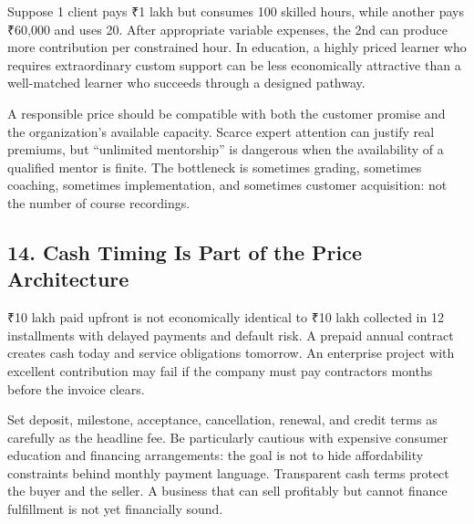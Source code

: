 Suppose 1 client pays ₹1 lakh but consumes 100 skilled hours, while another pays ₹60,000 and uses 20. After appropriate variable expenses, the 2nd can produce more contribution per constrained hour. In education, a highly priced learner who requires extraordinary custom support can be less economically attractive than a well-matched learner who succeeds through a designed pathway.

A responsible price should be compatible with both the customer promise and the organization's available capacity. Scarce expert attention can justify real premiums, but ``unlimited mentorship'' is dangerous when the availability of a qualified mentor is finite. The bottleneck is sometimes grading, sometimes coaching, sometimes implementation, and sometimes customer acquisition: not the number of course recordings.

\subsection*{14. Cash Timing Is Part of the Price Architecture}

₹10 lakh paid upfront is not economically identical to ₹10 lakh collected in 12 installments with delayed payments and default risk. A prepaid annual contract creates cash today and service obligations tomorrow. An enterprise project with excellent contribution may fail if the company must pay contractors months before the invoice clears.

Set deposit, milestone, acceptance, cancellation, renewal, and credit terms as carefully as the headline fee. Be particularly cautious with expensive consumer education and financing arrangements: the goal is not to hide affordability constraints behind monthly payment language. Transparent cash terms protect the buyer and the seller. A business that can sell profitably but cannot finance fulfillment is not yet financially sound.
